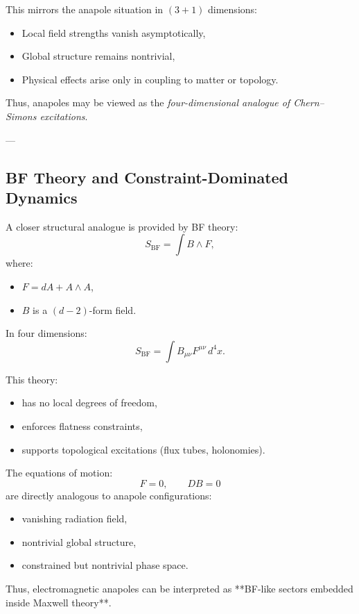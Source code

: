 \documentclass[11pt]{article}
\begin{document}
This mirrors the anapole situation in $(3+1)$ dimensions:
\begin{itemize}
\item Local field strengths vanish asymptotically,
\item Global structure remains nontrivial,
\item Physical effects arise only in coupling to matter or topology.
\end{itemize}

Thus, anapoles may be viewed as the \emph{four-dimensional analogue of Chern–Simons excitations}.

---

\subsection{BF Theory and Constraint-Dominated Dynamics}

A closer structural analogue is provided by BF theory:
\begin{equation}
S_{\text{BF}} = \int B \wedge F ,
\end{equation}
where:
\begin{itemize}
\item $F = dA + A \wedge A$,
\item $B$ is a $(d-2)$-form field.
\end{itemize}

In four dimensions:
\[
S_{\text{BF}} = \int B_{\mu\nu} F^{\mu\nu} \, d^4x.
\]

This theory:
\begin{itemize}
\item has no local degrees of freedom,
\item enforces flatness constraints,
\item supports topological excitations (flux tubes, holonomies).
\end{itemize}

The equations of motion:
\[
F = 0, \qquad D B = 0
\]
are directly analogous to anapole configurations:
\begin{itemize}
\item vanishing radiation field,
\item nontrivial global structure,
\item constrained but nontrivial phase space.
\end{itemize}

Thus, electromagnetic anapoles can be interpreted as **BF-like sectors embedded inside Maxwell theory**.
\end{document}
